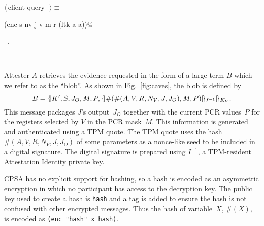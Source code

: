 \documentclass[titlepage,12pt]{article}
\theoremstyle{definition}
\newcommand{\hash}[1]{\#(#1)}
\begin{document}
\begin{description}
\begin{flushleft} \small
\begin{minipage}{\linewidth} \label{scrap6}
$\langle\,$client query\nobreak\ {\footnotesize {}}$\,\rangle\equiv$
\vspace{-1ex}
\begin{list}{}{} \item
\mbox{}\verb@(enc s nv j v m r (ltk a a))@{\NWsep}
\end{list}
\vspace{-1ex}
\footnotesize\addtolength{\baselineskip}{-1ex}
\begin{list}{}{\setlength{\itemsep}{-\parsep}\setlength{\itemindent}{-\leftmargin}}
\item \NWtxtMacroRefIn\ .
\end{list}
\end{minipage}\\[4ex]
\end{flushleft}
\item[$A\to C:\atoca\colon$]
Attester $A$ retrieves the evidence requested in the form of
a large term $B$ which we refer to as the ``blob''. As shown
in Fig.~\ref{fig:caves}, the blob is defined by
$$B = \blob.$$ This message packages $J$'s output~$J_O$ together with
the current PCR values~$P$ for the registers selected by $V$ in the
PCR mask~$M$.  This information is generated and authenticated using a
TPM quote.  The TPM quote uses the hash $\hash{A,V,R,N_V,J,J_O}$ of some
parameters as a nonce-like seed to be included in a digital signature.
The digital signature is prepared using $I^{-1}$, a TPM-resident
Attestation Identity private key.

CPSA has no explicit support for hashing, so a
hash is encoded as an asymmetric encryption in which no participant
has access to the decryption key.  The public key used to create a
hash is \texttt{hash} and a tag is added to ensure the hash is not
confused with other encrypted messages.  Thus the hash of
variable~$X$,  $\hash{X},$ is encoded as \texttt{(enc "hash" x hash)}.


\end{description}
\end{document}
